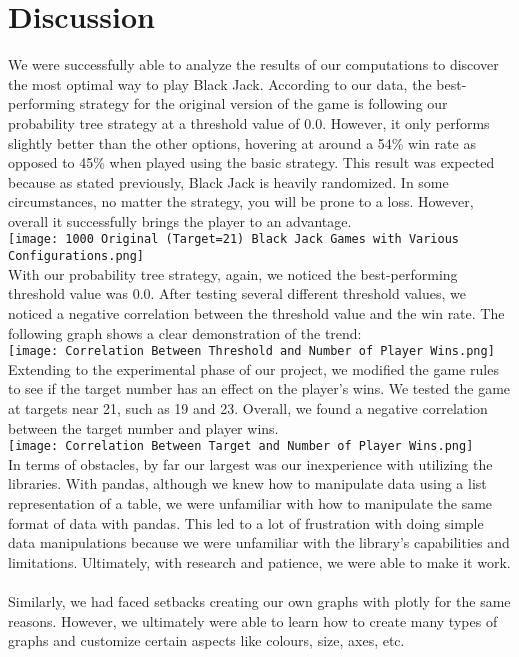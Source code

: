 \documentclass[fontsize=11pt]{article}
\begin{document}
\section*{Discussion}
We were successfully able to analyze the results of our computations to discover the most optimal way to play Black Jack. According to our data, the best-performing strategy for the original version of the game is following our probability tree strategy at a threshold value of 0.0. However, it only performs slightly better than the other options, hovering at around a 54\% win rate as opposed to 45\% when played using the basic strategy. This result was expected because as stated previously, Black Jack is heavily randomized. In some circumstances, no matter the strategy, you will be prone to a loss. However, overall it successfully brings the player to an advantage.
\\
\texttt{[image: 1000 Original (Target=21) Black Jack Games with Various Configurations.png]}
\\
With our probability tree strategy, again, we noticed the best-performing threshold value  was 0.0. After testing several different threshold values, we noticed a negative correlation between the threshold value and the win rate. The following graph shows a clear demonstration of the trend:
\\
\texttt{[image: Correlation Between Threshold and Number of Player Wins.png]}
\\
Extending to the experimental phase of our project, we modified the game rules to see if the target number has an effect on the player's wins. We tested the game at targets near 21, such as 19 and 23. Overall, we found a negative correlation between the target number and player wins.
\\
\texttt{[image: Correlation Between Target and Number of Player Wins.png]}
\\
In terms of obstacles, by far our largest was our inexperience with utilizing the libraries. With pandas, although we knew how to manipulate data using a list representation of a table, we were unfamiliar with how to manipulate the same format of data with pandas. This led to a lot of frustration with doing simple data manipulations because we were unfamiliar with the library's capabilities and limitations. Ultimately, with research and patience, we were able to make it work.
\\\\
Similarly, we had faced setbacks creating our own graphs with plotly for the same reasons. However, we ultimately were able to learn how to create many types of graphs and customize certain aspects like colours, size, axes, etc.
\end{document}
